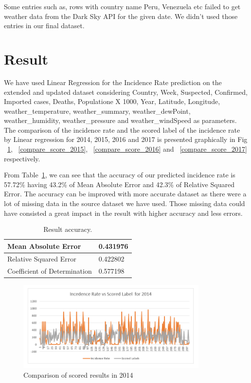 \documentclass[conference]{IEEEtran}
\begin{document}
Some entries such as, rows with country name Peru, Venezuela etc failed to get weather data from the Dark Sky API for the given date. We didn’t used those entries in our final dataset. 



\section{Result}
 We have used Linear Regression for the Incidence Rate prediction on the extended and updated dataset considering Country, Week, Suspected, Confirmed, Imported cases, Deaths, Populatione X 1000, Year, Latitude, Longitude, weather\_temperature, weather\_summary, weather\_dewPoint, weather\_humidity, weather\_pressure and weather\_windSpeed as parameters. The comparison of the incidence rate and the scored label of the incidence rate by Linear regression for 2014, 2015, 2016 and 2017 is presented graphically in Fig ~\ref{compare_score_2014}, ~\ref{compare_score_2015}, ~\ref{compare_score_2016} and ~\ref{compare_score_2017} respectively. 

From Table~\ref{tab:table1}, we can see that the accuracy of our predicted incidence rate is 57.72\% having 43.2\% of Mean Absolute Error and 42.3\% of Relative Squared Error. The accuracy can be improved with more accurate dataset as there were a lot of missing data in the source dataset we have used. Those missing data could have consisted a great impact in the result with higher accuracy and less errors.

\begin{table}[h!]
  \begin{center}
    \caption{Result accuracy.}
    \label{tab:table1}
\begin{tabular}{|l|l|}
\hline
Mean Absolute Error          & 0.431976 \\ \hline
Relative Squared Error       & 0.422802 \\ \hline
Coefficient of Determination & 0.577198 \\ \hline
\end{tabular}
  \end{center}
\end{table}


\begin{figure}[ht!] %
 \centering
 \includegraphics[width=3.75in]{5.png}
 \caption{Comparison of scored results in 2014 }
 \label{compare_score_2014}
 \end{figure}
\end{document}
